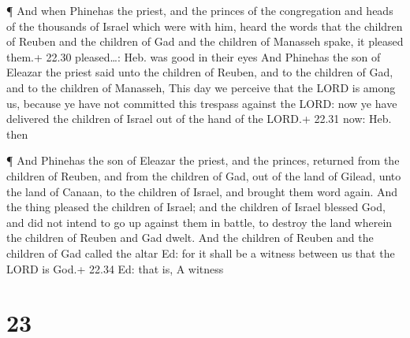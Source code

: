  ¶ And when Phinehas the priest, and the princes of the
congregation and heads of the thousands of Israel which were with him,
heard the words that the children of Reuben and the children of Gad and
the children of Manasseh spake, it pleased them.+ 22.30 pleased\ldots:
Heb. was good in their eyes  And Phinehas the son of
Eleazar the priest said unto the children of Reuben, and to the children
of Gad, and to the children of Manasseh, This day we perceive that the
LORD is among us, because ye have not committed this trespass against
the LORD: now ye have delivered the children of Israel out of the hand
of the LORD.+ 22.31 now: Heb. then

 ¶ And Phinehas the son of Eleazar the priest, and the
princes, returned from the children of Reuben, and from the children of
Gad, out of the land of Gilead, unto the land of Canaan, to the children
of Israel, and brought them word again.  And the thing
pleased the children of Israel; and the children of Israel blessed God,
and did not intend to go up against them in battle, to destroy the land
wherein the children of Reuben and Gad dwelt.  And the
children of Reuben and the children of Gad called the altar Ed: for it
shall be a witness between us that the LORD is God.+ 22.34 Ed: that is,
A witness

\hypertarget{section-22}{%
\section{23}\label{section-22}}

